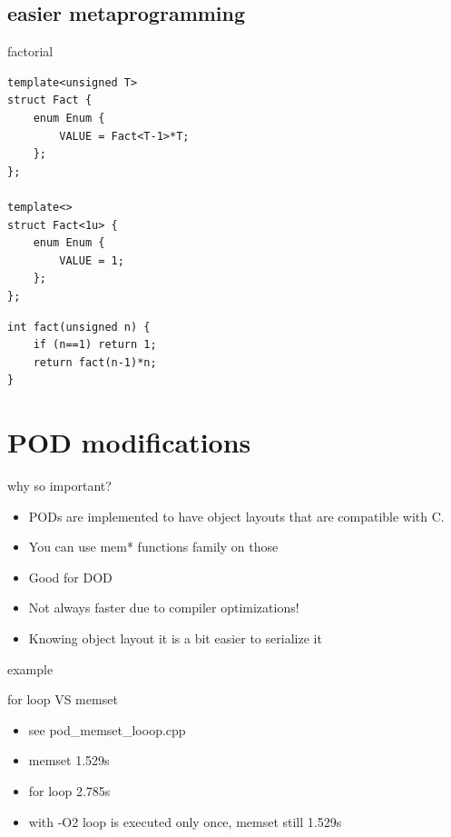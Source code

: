 \documentclass{beamer}
\begin{document}
\subsection{easier metaprogramming}
\begin{frame}{factorial}
  \begin{block}{}
\begin{verbatim}
template<unsigned T>
struct Fact {
    enum Enum {
        VALUE = Fact<T-1>*T;
    };
};

template<>
struct Fact<1u> {
    enum Enum {
        VALUE = 1;
    };
};

\end{verbatim}
  \end{block}

  \begin{block}{}
\begin{verbatim}
int fact(unsigned n) {
    if (n==1) return 1;
    return fact(n-1)*n;
}

\end{verbatim}
  \end{block}
\end{frame}

\section{POD modifications}
\begin{frame}{why so important?}
  \begin{itemize}
  \item PODs are implemented to have object layouts that are compatible with
    C.
  \item You can use mem* functions family on those
  \item Good for DOD
  \item Not always faster due to compiler optimizations!
  \item Knowing object layout it is a bit easier to serialize it
  \end{itemize}
\end{frame}

\begin{frame}{example}
  \begin{block}{for loop VS memset}
    \begin{itemize}
    \item see pod\_memset\_looop.cpp
    \item memset 1.529s
    \item for loop 2.785s
    \item with -O2 loop is executed only once, memset still 1.529s
    \end{itemize}
  \end{block}
\end{frame}
\end{document}
